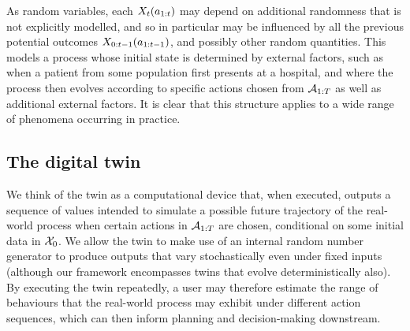 
As random variables, each $X_{t}(a_{1:t})$ may depend on additional randomness that is not explicitly modelled, and so in particular may be influenced by all the previous potential outcomes $X_{0:t-1}(a_{1:t-1})$, and possibly other random quantities.
This models a process whose initial state is determined by external factors, such as when a patient from some population first presents at a hospital, and where the process then evolves according to specific actions chosen from $\mathcal{A}_{1:T}$ as well as additional external factors.
It is clear that this structure applies to a wide range of phenomena occurring in practice.



\subsection{The digital twin}

We think of the twin as a computational device that, when executed, outputs a sequence of values intended to simulate a possible future trajectory of the real-world process when certain actions in $\mathcal{A}_{1:T}$ are chosen, conditional on some initial data in $\mathcal{X}_0$.
We allow the twin to make use of an internal random number generator to produce outputs that vary stochastically even under fixed inputs (although our framework encompasses twins that evolve deterministically also).
By executing the twin repeatedly, a user may therefore estimate the range of behaviours that the real-world process may exhibit under different action sequences, which can then inform planning and decision-making downstream.

